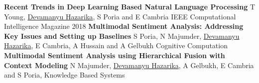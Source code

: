 
\begin{cvpublications}
  \cvpublication
    {\textbf{Recent Trends in Deep Learning Based Natural Language Processing}}  %
    {T Young, \underline{Devamanyu Hazarika}, S Poria and E Cambria} %
    {IEEE Computational Intelligence Magazine} %
    {2018} %
  \cvpublication
    {\textbf{Multimodal Sentiment Analysis: Addressing Key Issues and Setting up Baselines}}  %
    {S Poria, N Majumder, \underline{Devamanyu Hazarika}, E Cambria, A Hussain and A Gelbukh} %
    {Cognitive Computation} %
    {} %
  \cvpublication
    {\textbf{Multimodal Sentiment Analysis using Hierarchical Fusion with Context Modeling}}  %
    {N Majumder, \underline{Devamanyu Hazarika}, A Gelbukh, E Cambria and S Poria,} %
    {Knowledge Based Systems} %
    {} %
\end{cvpublications}

